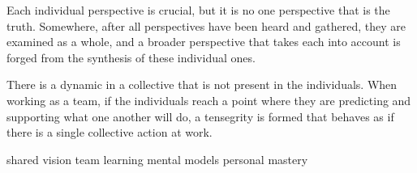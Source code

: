 \documentclass[10pt]{article}
\begin{document}
\maketitle

Each individual perspective is crucial, but it is no one perspective that is the truth.  Somewhere, after all perspectives have been heard and gathered, they are examined as a whole, and a broader perspective that takes each into account is forged from the synthesis of these individual ones. 

There is a dynamic in a collective that is not present in the individuals.  When working as a team, if the individuals reach a point where they are predicting and supporting what one another will do, a tensegrity is formed that behaves as if there is a single collective action at work.

shared vision
team learning 
mental models
personal mastery
\end{document}
